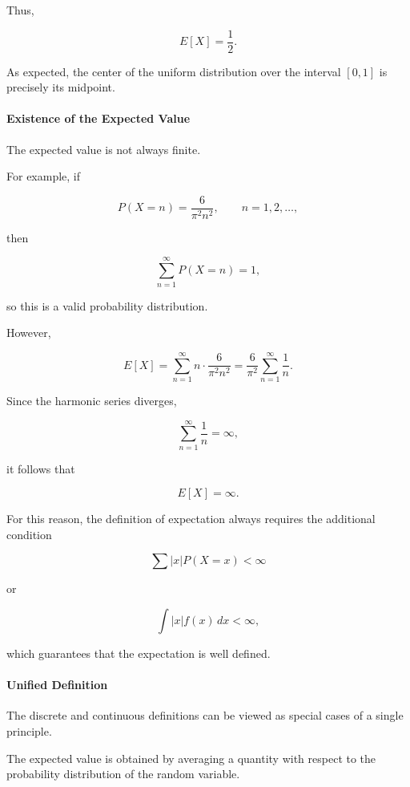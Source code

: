\documentclass[11pt]{article}
\begin{document}
\begin{mdframed}[
		linewidth=0.8pt,
		roundcorner=6pt,
		backgroundcolor=gray!5,
		linecolor=gray!60,
		innertopmargin=10pt,
		innerbottommargin=10pt,
		innerleftmargin=10pt,
		innerrightmargin=10pt
		]
		Thus,
		
		\[
		\boxed{
			E[X]=\frac12.
		}
		\]
		
		As expected, the center of the uniform distribution over the interval
		$[0,1]$ is precisely its midpoint.
		
		\bigskip
		
		\paragraph{Existence of the Expected Value}
		
		The expected value is not always finite.
		
		For example, if
		
		\[
		P(X=n)
		=
		\frac{6}{\pi^2n^2},
		\qquad
		n=1,2,\ldots,
		\]
		
		then
		
		\[
		\sum_{n=1}^{\infty}P(X=n)=1,
		\]
		
		so this is a valid probability distribution.
		
		However,
		
		\[
		E[X]
		=
		\sum_{n=1}^{\infty}
		n
		\cdot
		\frac{6}{\pi^2n^2}
		=
		\frac6{\pi^2}
		\sum_{n=1}^{\infty}
		\frac1n.
		\]
		
		Since the harmonic series diverges,
		
		\[
		\sum_{n=1}^{\infty}\frac1n=\infty,
		\]
		
		it follows that
		
		\[
		\boxed{
			E[X]=\infty.
		}
		\]
		
		For this reason, the definition of expectation always requires the
		additional condition
		
		\[
		\sum|x|P(X=x)<\infty
		\]
		
		or
		
		\[
		\int|x|f(x)\,dx<\infty,
		\]
		
		which guarantees that the expectation is well defined.
		
		\bigskip
		
		\paragraph{Unified Definition}
		
		The discrete and continuous definitions can be viewed as special cases of a
		single principle.
		
		The expected value is obtained by averaging a quantity with respect to the
		probability distribution of the random variable.
		

\end{mdframed}
\end{document}

